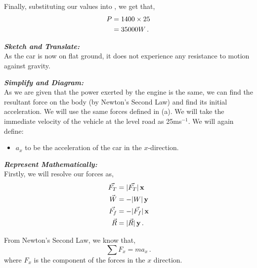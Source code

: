 \begin{subquestions}
Finally, substituting our values into , we get that,
\begin{align}
	P & = 1400 \times 25 \nonumber \\
	  & = 35000W \,.
\end{align}


\subquestion
	
\begin{subsubquestions}
	
\subsubquestion

\textbf{\textit{Sketch and Translate:}} \\
As the car is now on flat ground, it does not experience any resistance to motion against gravity. 




\textbf{\textit{Simplify and Diagram:}} \\
As we are given that the power exerted by the engine is the same, we can find the resultant force on the body (by Newton's Second Law) and find its initial acceleration. We will use the same forces defined in (a). We will take the immediate velocity of the vehicle at the level road as 25ms$^{-1}$.
We will again define:
\begin{itemize}
	\item $a_x$ to be the acceleration of the car in the $x$-direction.
\end{itemize}



\textbf{\textit{Represent Mathematically:}} \\
Firstly, we will resolve our forces as,
\begin{align}
	\vec{F_T} & = |\vec{F_T}|\,\mathbf{x} \\
	\vec{W} & = -|W|\,\mathbf{y} \\
	\vec{F_f} & = -|\vec{F_f}|\,\mathbf{x} \\
	\vec{R} & = |\vec{R}|\,\mathbf{y} \,.
\end{align}

From Newton's Second Law, we know that,
\begin{equation}
	\sum F_x = ma_x \label{2009:q5:FxEqn2} \,.
\end{equation}
where $F_x$ is the component of the forces in the $x$ direction.





\end{subsubquestions}
\end{subquestions}
